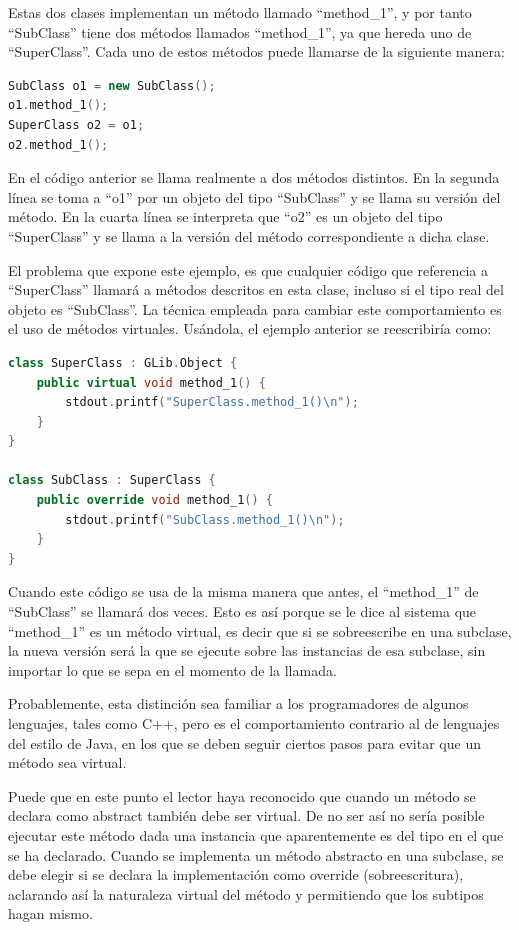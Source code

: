 \documentclass[12pt,twoside]{book}
\begin{document}
Estas dos clases implementan un método llamado ``method\_1'', y por tanto ``SubClass'' tiene dos métodos llamados ``method\_1'', ya que hereda uno de ``SuperClass''. Cada uno de estos métodos puede llamarse de la siguiente manera:

\begin{lstlisting}[language=C++]
SubClass o1 = new SubClass();
o1.method_1();
SuperClass o2 = o1;
o2.method_1();
\end{lstlisting}

En el código anterior se llama realmente a dos métodos distintos. En la segunda línea se toma a ``o1'' por un objeto del tipo ``SubClass'' y se llama su versión del método. En la cuarta línea se interpreta que ``o2'' es un objeto del tipo ``SuperClass'' y se llama a la versión del método correspondiente a dicha clase.

El problema que expone este ejemplo, es que cualquier código que referencia a ``SuperClass'' llamará a métodos descritos en esta clase, incluso si el tipo real del objeto es ``SubClass''. La técnica empleada para cambiar este comportamiento es el uso de métodos virtuales. Usándola, el ejemplo anterior se reescribiría como:


\begin{lstlisting}[language=C++]
class SuperClass : GLib.Object {
	public virtual void method_1() {
		stdout.printf("SuperClass.method_1()\n");
	}
}

class SubClass : SuperClass {
	public override void method_1() {
		stdout.printf("SubClass.method_1()\n");
	}
}
\end{lstlisting}



Cuando este código se usa de la misma manera que antes, el ``method\_1'' de ``SubClass'' se llamará dos veces. Esto es así porque se le dice al sistema que ``method\_1'' es un método virtual, es decir que si se sobreescribe en una subclase, la nueva versión será la que se ejecute sobre las instancias de esa subclase, sin importar lo que se sepa en el momento de la llamada.

Probablemente, esta distinción sea familiar a los programadores de algunos lenguajes, tales como C++, pero es el comportamiento contrario al de lenguajes del estilo de Java, en los que se deben seguir ciertos pasos para evitar que un método sea virtual.

Puede que en este punto el lector haya reconocido que cuando un método se declara como abstract también debe ser virtual. De no ser así no sería posible ejecutar este método dada una instancia que aparentemente es del tipo en el que se ha declarado. Cuando se implementa un método abstracto en una subclase, se debe elegir si se declara la implementación como override (sobreescritura), aclarando así la naturaleza virtual del método y permitiendo que los subtipos hagan mismo.
\end{document}
